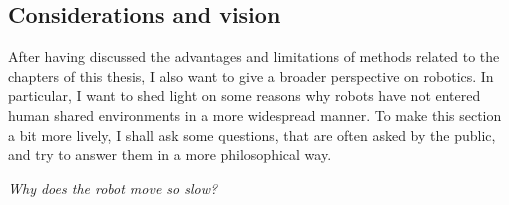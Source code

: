 

\subsection{Considerations and vision}
\label{sec:discussion_vision}

After having discussed the advantages and limitations of
methods related to the chapters of this thesis, I also want
to give a broader perspective on robotics. In particular, I
want to shed light on some reasons why robots have not
entered human shared environments in a more widespread
manner. To make this section a bit more lively, I shall ask
some questions, that are often asked by the public, and
try to answer them in a more philosophical way.


\textit{Why does the robot move so slow?}

